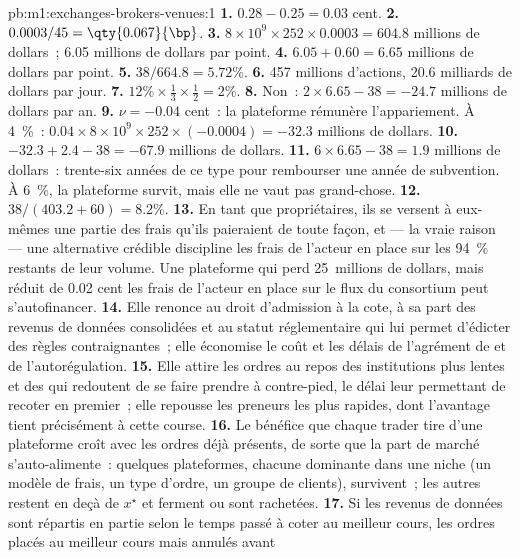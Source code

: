 \begin{solution}{pb:m1:exchanges-brokers-venues:1}
\textbf{1.} $0.28 - 0.25 = 0.03$ cent.
\textbf{2.} $0.0003/45 = \qty{0.067}{\bp}$.
\textbf{3.} $8\times10^9 \times 252 \times 0.0003 = 604.8$ millions de dollars~; 6.05
millions de dollars par point.
\textbf{4.} $6.05 + 0.60 = 6.65$ millions de dollars par point.
\textbf{5.} $38/664.8 = 5.72\%$.
\textbf{6.} 457 millions d'actions, 20.6 milliards de dollars par jour.
\textbf{7.} $12\% \times \tfrac13 \times \tfrac12 = 2\%$.
\textbf{8.} Non~: $2 \times 6.65 - 38 = -24.7$ millions de dollars par an.
\textbf{9.} $\nu = -0.04$ cent~: la plateforme rémunère l'appariement. À 4~\%~:
$0.04 \times 8\times10^9 \times 252 \times (-0.0004) = -32.3$ millions de dollars.
\textbf{10.} $-32.3 + 2.4 - 38 = -67.9$ millions de dollars.
\textbf{11.} $6 \times 6.65 - 38 = 1.9$ millions de dollars~: trente-six années de ce type pour
rembourser une année de subvention. À 6~\%, la plateforme survit, mais elle ne vaut pas grand-chose.
\textbf{12.} $38/(403.2 + 60) = 8.2\%$.
\textbf{13.} En tant que propriétaires, ils se versent à eux-mêmes une partie des frais qu'ils paieraient
de toute façon, et --- la vraie raison --- une alternative crédible discipline les
frais de l'acteur en place sur les 94~\% restants de leur volume. Une plateforme qui perd
25~millions de dollars, mais réduit de 0.02 cent les frais de l'acteur en place sur le flux du consortium
peut s'autofinancer.
\textbf{14.} Elle renonce au droit d'admission à la cote, à sa part des revenus de données consolidées
et au statut réglementaire qui lui permet d'édicter des règles contraignantes~; elle
économise le coût et les délais de l'agrément de  et de l'autorégulation.
\textbf{15.} Elle attire les ordres au repos des institutions plus lentes et des  qui redoutent de se faire prendre à contre-pied, le délai leur permettant de recoter
en premier~; elle repousse les preneurs les plus rapides, dont l'avantage tient précisément à cette course.
\textbf{16.} Le bénéfice que chaque trader tire d'une plateforme croît avec les ordres déjà
présents, de sorte que la part de marché s'auto-alimente~: quelques plateformes, chacune dominante dans une niche
(un modèle de frais, un type d'ordre, un groupe de clients), survivent~; les autres restent en deçà de
$x^\star$ et ferment ou sont rachetées.
\textbf{17.} Si les revenus de données sont répartis en partie selon le temps passé à coter au
meilleur cours, les ordres placés au meilleur cours mais annulés avant

\end{solution}
